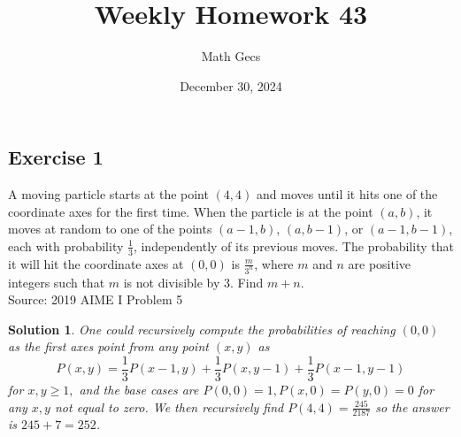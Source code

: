 \documentclass[12pt]{article}
\title{Weekly Homework 43}
\author{Math Gecs}
\date{December 30, 2024}
\newtheorem*{solution*}{Solution}
\begin{document}
\maketitle

\subsection*{Exercise 1}
A moving particle starts at the point $(4,4)$ and moves until it hits one of the coordinate axes for the first time. When the particle is at the point $(a,b)$, it moves at random to one of the points $(a-1,b)$, $(a,b-1)$, or $(a-1,b-1)$, each with probability $\frac{1}{3}$, independently of its previous moves. The probability that it will hit the coordinate axes at $(0,0)$ is $\frac{m}{3^n}$, where $m$ and $n$ are positive integers such that $m$ is not divisible by $3$. Find $m + n$.\\

Source: 2019 AIME I Problem 5\\

\begin{solution*}
One could recursively compute the probabilities of reaching $(0,0)$ as the first axes point from any point $(x,y)$ as\[P(x,y) = \frac{1}{3} P(x-1,y) + \frac{1}{3} P(x,y-1) + \frac{1}{3} P(x-1,y-1)\]for $x,y \geq 1,$ and the base cases are $P(0,0) = 1, P(x,0) = P(y,0) = 0$ for any $x,y$ not equal to zero. We then recursively find $P(4,4) = \frac{245}{2187}$ so the answer is $245 + 7 = \boxed{252}$.
\end{solution*}
\end{document}

